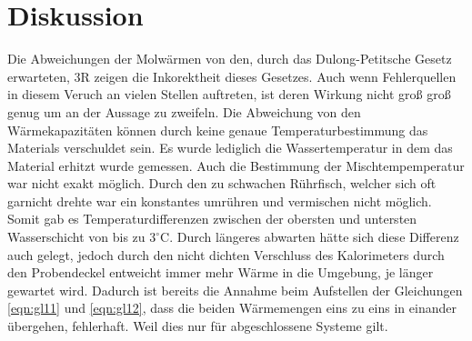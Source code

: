 \section{Diskussion}
\label{sec:Diskussion}
Die Abweichungen der Molwärmen von den, durch das Dulong-Petitsche Gesetz erwarteten, 3R zeigen die Inkorektheit dieses Gesetzes.
Auch wenn Fehlerquellen in diesem Veruch an vielen Stellen auftreten, ist deren Wirkung nicht groß groß genug um an der Aussage zu zweifeln.
Die Abweichung von den Wärmekapazitäten können durch keine genaue Temperaturbestimmung das Materials verschuldet sein.
Es wurde lediglich die Wassertemperatur in dem das Material erhitzt wurde gemessen.
Auch die Bestimmung der Mischtempemperatur war nicht exakt möglich.
Durch den zu schwachen Rührfisch, welcher sich oft garnicht drehte war ein konstantes umrühren und vermischen nicht möglich.
Somit gab es Temperaturdifferenzen zwischen der obersten und untersten Wasserschicht von bis zu $3^\circ$C.
Durch längeres abwarten hätte sich diese Differenz auch gelegt, jedoch durch den nicht dichten Verschluss des Kalorimeters durch den Probendeckel entweicht immer mehr Wärme in die Umgebung, je länger gewartet wird.
Dadurch ist bereits die Annahme beim Aufstellen der Gleichungen \eqref{eqn:gl11} und \eqref{eqn:gl12}, dass die beiden Wärmemengen eins zu eins in einander übergehen, fehlerhaft.
Weil dies nur für abgeschlossene Systeme gilt.
